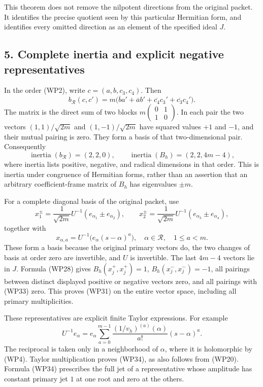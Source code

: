 \documentclass[
  10pt,
  a4paper,
]{article}
\begin{document}
This theorem does not remove the nilpotent directions from the original
packet. It identifies the precise quotient seen by this particular
Hermitian form, and identifies every omitted direction as an element of
the specified ideal \(J\).

\subsection{5. Complete inertia and explicit negative
representatives}\label{complete-inertia-and-explicit-negative-representatives}

In the order (WP2), write \(c=(a,b,c_3,c_4)\). Then \[
b_{\mathcal R}(c,c')
=m\bigl(\overline b a'+\overline a b'
+\overline{c_4}c_3'+\overline{c_3}c_4'\bigr).
\tag{WP30}
\] The matrix is the direct sum of two blocks
\(m\begin{pmatrix}0&1\\1&0\end{pmatrix}\). In each pair the two vectors
\((1,1)/\sqrt{2m}\) and \((1,-1)/\sqrt{2m}\) have squared values \(+1\)
and \(-1\), and their mutual pairing is zero. They form a basis of that
two-dimensional pair. Consequently \[
\operatorname{inertia}(b_{\mathcal R})=(2,2,0),
\qquad
\operatorname{inertia}(B_h)=(2,2,4m-4),
\tag{WP31}
\] where inertia lists positive, negative, and radical dimensions in
that order. This is inertia under congruence of Hermitian forms, rather
than an assertion that an arbitrary coefficient-frame matrix of \(B_h\)
has eigenvalues \(\pm m\).

For a complete diagonal basis of the original packet, use \[
x_1^{\pm}=\frac1{\sqrt{2m}}U^{-1}(e_{\alpha_1}\pm e_{\alpha_2}),
\qquad
x_2^{\pm}=\frac1{\sqrt{2m}}U^{-1}(e_{\alpha_3}\pm e_{\alpha_4}),
\tag{WP32}
\] together with \[
x_{\alpha,a}=U^{-1}\bigl(e_\alpha(s-\alpha)^a\bigr),
\quad \alpha\in\mathcal R,\quad 1\le a<m.
\tag{WP33}
\] These form a basis because the original primary vectors do, the two
changes of basis at order zero are invertible, and \(U\) is invertible.
The last \(4m-4\) vectors lie in \(J\). Formula (WP28) gives
\(B_h(x_j^+,x_j^+)=1\), \(B_h(x_j^-,x_j^-)=-1\), all pairings between
distinct displayed positive or negative vectors zero, and all pairings
with (WP33) zero. This proves (WP31) on the entire vector space,
including all primary multiplicities.

These representatives are explicit finite Taylor expressions. For
example \[
U^{-1}e_\alpha
=e_\alpha\sum_{a=0}^{m-1}
\frac{(1/v_h)^{(a)}(\alpha)}{a!}(s-\alpha)^a.
\tag{WP34}
\] The reciprocal is taken only in a neighborhood of \(\alpha\), where
it is holomorphic by (WP4). Taylor multiplication proves (WP34), as also
follows from (WP20). Formula (WP34) prescribes the full jet of a
representative whose amplitude has constant primary jet \(1\) at one
root and zero at the others.
\end{document}
